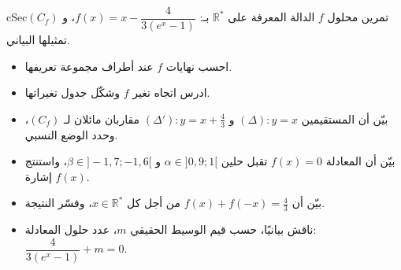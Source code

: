 \documentclass[12pt,a4paper]{article}
\newenvironment{BOX}[2]{\begin{otherlanguage}{english}\begin{arbox}{#1}{#2}}{\end{arbox}\end{otherlanguage}}
\newcounter{exo}
\newcommand{\R}{\mathbb{R}}
\newenvironment{sq}{\begin{itemize}[leftmargin=2.4em,itemsep=3pt]}{\end{itemize}}
\newcommand{\qa}{\item[(أ)]}\newcommand{\qb}{\item[(ب)]}\newcommand{\qc}{\item[(جـ)]}\newcommand{\qd}{\item[(د)]}\newcommand{\qe}{\item[(هـ)]}
\newenvironment{tmr}{\stepcounter{exo}\begin{BOX}{cSec}{تمرين محلول \theexo}}{\end{BOX}}
\let\origNeedspace\Needspace
\renewcommand{\Needspace}[1]{\origNeedspace{14\baselineskip}}
\begin{document}
\origNeedspace{20\baselineskip}
\begin{tmr}
$f$ الدالة المعرفة على $\R^{*}$ بـ: $f(x)=x-\dfrac{4}{3\left(e^{x}-1\right)}$، و $(C_f)$ تمثيلها البياني.
\begin{sq}
\qa احسب نهايات $f$ عند أطراف مجموعة تعريفها.
\qb ادرس اتجاه تغير $f$ وشكّل جدول تغيراتها.
\qc بيّن أن المستقيمين $(\Delta):y=x$ و $(\Delta'):y=x+\frac{4}{3}$ مقاربان مائلان لـ $(C_f)$، وحدد الوضع النسبي.
\qd بيّن أن المعادلة $f(x)=0$ تقبل حلين $\alpha\in]0{,}9;1[$ و $\beta\in]-1{,}7;-1{,}6[$، واستنتج إشارة $f(x)$.
\qe بيّن أن $f(x)+f(-x)=\frac{4}{3}$ من أجل كل $x\in\R^{*}$، وفسّر النتيجة.
\item[(و)] ناقش بيانيًا، حسب قيم الوسيط الحقيقي $m$، عدد حلول المعادلة: $\dfrac{4}{3\left(e^{x}-1\right)}+m=0$.
\end{sq}
\end{tmr}
\end{document}
